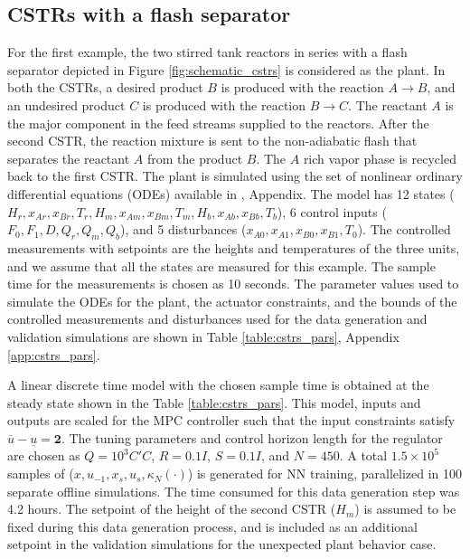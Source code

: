 \documentclass[preprint,5p, twocolumn, authoryear]{elsarticle}
\begin{document}
\subsection{CSTRs with a flash separator}
For the first example, the two 
stirred tank reactors in series with a flash separator
depicted in Figure \ref{fig:schematic_cstrs} 
is considered as the plant.
In both the CSTRs, a desired product $B$ is produced 
with the reaction $A \rightarrow B$, and an undesired 
product $C$ is produced with the reaction $B \rightarrow C$. 
The reactant $A$ is the major component in the 
feed streams supplied to the 
reactors. After the second CSTR, the reaction mixture is 
sent to the non-adiabatic flash that separates the reactant $A$
from the product $B$. The $A$ rich vapor phase 
is recycled back to the first CSTR. 
The plant is simulated using the set of 
nonlinear ordinary differential equations (ODEs) available in 
\cite*{venkat:2006}, Appendix.
The model has 12 states 
($H_r, x_{Ar}, x_{Br}, T_r, 
H_m, x_{Am}, x_{Bm}, T_m, H_b, x_{Ab}, x_{Bb}, T_b$),
6 control inputs 
($F_0, F_1, D, Q_r, Q_m, Q_b$), and 5 disturbances
($x_{A0}, x_{A1}, x_{B0}, x_{B1}, T_0$).
The controlled measurements with setpoints are the heights
and temperatures of the three units, and we
assume that all the states are measured for this example. 
The sample time for the measurements is chosen as 10 seconds. 
The parameter values used to simulate the ODEs for the plant, 
the actuator constraints, and the bounds of the controlled 
measurements and disturbances used for the data generation 
and validation simulations are 
shown in Table \ref{table:cstrs_pars}, Appendix \ref{app:cstrs_pars}.

A linear discrete time model with the chosen sample time
is obtained at the steady state shown in the Table 
\ref{table:cstrs_pars}.
This model, inputs and outputs are scaled 
for the MPC controller such that the input 
constraints satisfy
$\overline{u} - \underline{u} = \mathbf{2}$.
The tuning parameters and 
control horizon length for the regulator are chosen as
$Q = 10^3 C'C$, $R = 0.1 I$, $S = 0.1 I$, 
and $N = 450$.
A total $1.5 \times 10^5$ samples of 
($x, u_{-1}, x_s, u_s, \kappa_N(\cdot)$) 
is generated for NN training, parallelized in 100 
separate offline simulations. The time consumed 
for this data generation step was 4.2 hours.
The setpoint of the 
height of the second CSTR ($H_m$) is assumed 
to be fixed during this data generation process, 
and is included as an additional setpoint
in the validation simulations for the 
unexpected plant behavior case.
\end{document}
